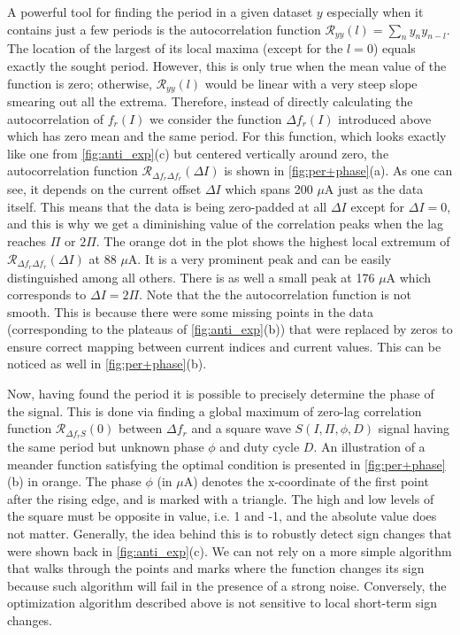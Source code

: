 \documentclass[%
 aip,
 amsmath,amssymb,
 reprint,%
]{revtex4-1}
\begin{document}
A powerful tool for finding the period in a given dataset $y$ especially when it contains just a few periods is the autocorrelation function $\mathcal{R}_{y y}(l) = \sum_n y_n y_{n-l}$. The location of the largest of its local maxima (except for the $l=0$) equals exactly the sought period. However, this is only true when the mean value of the function is zero; otherwise, $\mathcal{R}_{y y}(l)$ would be linear with a very steep slope smearing out all the extrema. Therefore, instead of directly calculating the autocorrelation of $f_r (I)$ we consider the function $\Delta f_r (I)$ introduced above which has zero mean and the same period. For this function, which looks exactly like one from \autoref{fig:anti_exp}(c) but centered vertically around zero, the autocorrelation function $\mathcal{R}_{\Delta f_r \Delta f_r}(\Delta I)$ is shown in \autoref{fig:per+phase}(a). As one can see, it depends on the current offset $\Delta I$ which spans 200 $\mu$A just as the data itself. This means that the data is being zero-padded at all $\Delta I$ except for $\Delta I = 0$, and this is why we get a diminishing value of the correlation peaks when the lag reaches $\Pi$ or $2\Pi$. The orange dot in the plot shows the highest local extremum of $\mathcal{R}_{\Delta f_r \Delta f_r}(\Delta I)$ at 88 $\mu$A. It is a very prominent peak and can be easily distinguished among all others. There is as well a small peak at 176 $\mu$A which corresponds to $\Delta I = 2\Pi$. Note that the the autocorrelation function is not smooth. This is because there were some missing points in the data (corresponding to the plateaus of \autoref{fig:anti_exp}(b)) that were replaced by zeros to ensure correct mapping between current indices and current values. This can be noticed as well in \autoref{fig:per+phase}(b).

Now, having found the period it is possible to precisely determine the phase of the signal. This is done via finding a global maximum of zero-lag correlation function  $\mathcal{R}_{\Delta f_r S}(0)$ between $\Delta f_r$ and a square wave $S(I, \Pi, \phi, D)$ signal having the same period but unknown phase $\phi$ and duty cycle $D$. An illustration of a meander function satisfying the optimal condition is presented in \autoref{fig:per+phase}(b) in orange. The phase $\phi$ (in $\mu$A) denotes the x-coordinate of the first point after the rising edge, and is marked with a triangle. The high and low levels of the square must be opposite in value, i.e. 1 and -1, and the absolute value does not matter. Generally, the idea behind this is to robustly detect sign changes that were shown back in \autoref{fig:anti_exp}(c). We can not rely on a more simple algorithm that walks through the points and marks where the function changes its sign because such algorithm will fail in the presence of a strong noise. Conversely, the optimization algorithm described above is not sensitive to local short-term sign changes.
\end{document}
